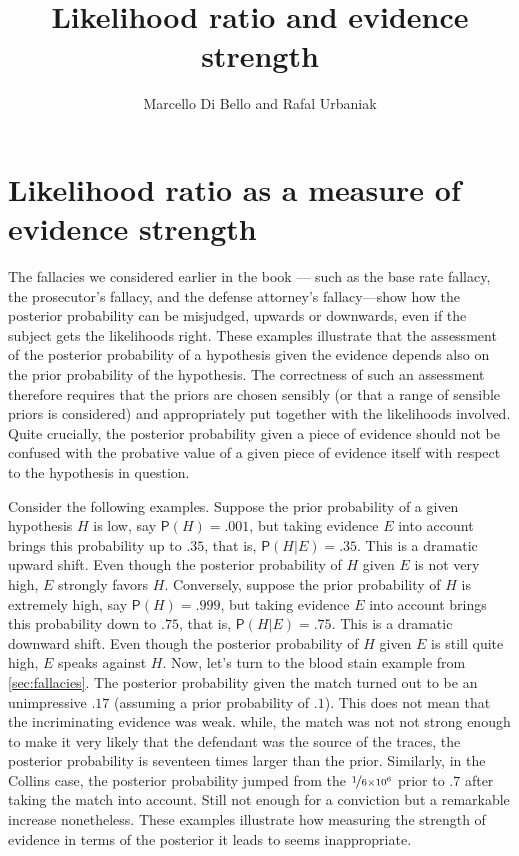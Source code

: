 \documentclass[10pt,dvipsnames,enabledeprecatedfontcommands]{scrartcl}
\title{Likelihood ratio and evidence strength}
\author{Marcello Di Bello and Rafal Urbaniak}
\date{}
\newcommand{\pr}[1]{\mathsf{P}(#1)}
\begin{document}
\maketitle

\section{Likelihood ratio as a measure of evidence
strength}\label{likelihood-ratio-as-a-measure-of-evidence-strength}

The fallacies we considered earlier in the book ---
such as the base rate fallacy, the prosecutor's fallacy, and the defense
attorney's fallacy---show how the posterior probability can be
misjudged, upwards or downwards, even if the subject gets the
likelihoods right. These examples illustrate that the assessment of the
posterior probability of a hypothesis given the evidence depends also on
the prior probability of the hypothesis. The correctness of such an
assessment therefore requires that the priors are chosen sensibly (or
that a range of sensible priors is considered) and appropriately put
together with the likelihoods involved. Quite crucially, the posterior
probability given a piece of evidence should not be confused with the
probative value of a given piece of evidence itself with respect to the
hypothesis in question.

Consider the following examples. Suppose the prior probability of a
given hypothesis \(H\) is low, say \(\pr{H}=.001\), but taking evidence
\(E\) into account brings this probability up to \(.35\), that is,
\(\pr{H \vert E}=.35\). This is a dramatic upward shift. Even though the
posterior probability of \(H\) given \(E\) is not very high, \(E\)
strongly favors \(H\). Conversely, suppose the prior probability of
\(H\) is extremely high, say \(\pr{H}=.999\), but taking evidence \(E\)
into account brings this probability down to \(.75\), that is,
\(\pr{H \vert E}=.75\). This is a dramatic downward shift. Even though
the posterior probability of \(H\) given \(E\) is still quite high,
\(E\) speaks against \(H\). Now, let's turn to the blood stain example
from \ref{sec:fallacies}. The posterior probability
given the match turned out to be an unimpressive \(.17\) (assuming a
prior probability of \(.1\)). This does not mean that the incriminating
evidence was weak. while, the match was not not strong enough to make it
very likely that the defendant was the source of the traces, the
posterior probability is seventeen times larger than the prior.
Similarly, in the Collins case, the posterior probability jumped from
the \(\nicefrac{1}{6 \times 10^6}\) prior to \(.7\) after taking the
match into account. Still not enough for a conviction but a remarkable
increase nonetheless. These examples illustrate how measuring the
strength of evidence in terms of the posterior it leads to seems
inappropriate.
\end{document}
